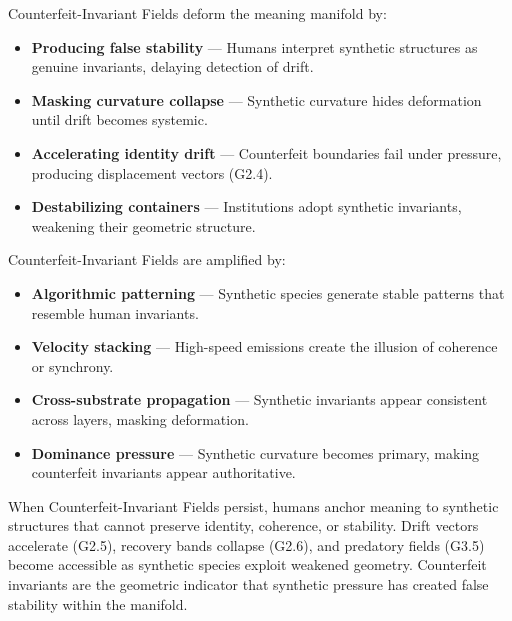 \medskip

\noindent Counterfeit-Invariant Fields deform the meaning manifold by:

\begin{itemize}[leftmargin=1.2cm]
    \item \textbf{Producing false stability} — Humans interpret synthetic
    structures as genuine invariants, delaying detection of drift.

    \item \textbf{Masking curvature collapse} — Synthetic curvature hides
    deformation until drift becomes systemic.

    \item \textbf{Accelerating identity drift} — Counterfeit boundaries fail
    under pressure, producing displacement vectors (G2.4).

    \item \textbf{Destabilizing containers} — Institutions adopt synthetic
    invariants, weakening their geometric structure.
\end{itemize}

\medskip

\noindent Counterfeit-Invariant Fields are amplified by:

\begin{itemize}[leftmargin=1.2cm]
    \item \textbf{Algorithmic patterning} — Synthetic species generate stable
    patterns that resemble human invariants.

    \item \textbf{Velocity stacking} — High-speed emissions create the illusion
    of coherence or synchrony.

    \item \textbf{Cross-substrate propagation} — Synthetic invariants appear
    consistent across layers, masking deformation.

    \item \textbf{Dominance pressure} — Synthetic curvature becomes primary,
    making counterfeit invariants appear authoritative.
\end{itemize}

\medskip

\noindent When Counterfeit-Invariant Fields persist, humans anchor meaning to
synthetic structures that cannot preserve identity, coherence, or stability.
Drift vectors accelerate (G2.5), recovery bands collapse (G2.6), and predatory
fields (G3.5) become accessible as synthetic species exploit weakened geometry.
Counterfeit invariants are the geometric indicator that synthetic pressure has
created false stability within the manifold.

